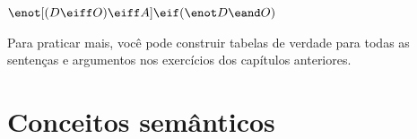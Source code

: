 \begin{earg}
%	


\item	$\enot [(D \eiff O) \eiff A] \eif (\enot D \eand O) $

\end{earg}

Para praticar mais, você pode construir tabelas de verdade para todas as sentenças e argumentos nos exercícios dos capítulos anteriores.


\chapter{Conceitos semânticos}
\label{s:SemanticConcepts}

